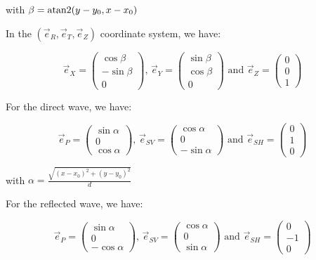 \documentclass[main.tex]{subfiles}
\begin{document}
with $\beta = \operatorname{atan2} (y - y_0 , x - x_0)$

In the $(\vec{e}_R, \vec{e}_T, \vec{e}_Z)$ coordinate system, we have:

\begin{equation}
\vec{e}_X = \begin{pmatrix}
\cos \beta \\
- \sin \beta \\
0
\end{pmatrix} \text{, } \vec{e}_Y = \begin{pmatrix}
\sin \beta \\
\cos \beta \\
0
\end{pmatrix} \text{ and } \vec{e}_Z = \begin{pmatrix}
0 \\
0 \\
1
\end{pmatrix}
\end{equation}

For the direct wave, we have:

\begin{equation}
\vec{e}_P = \begin{pmatrix}
\sin \alpha \\
0 \\
\cos \alpha
\end{pmatrix} \text{, } \vec{e}_{SV} = \begin{pmatrix}
\cos \alpha \\
0 \\
- \sin \alpha
\end{pmatrix} \text{ and } \vec{e}_{SH} = \begin{pmatrix}
0 \\
1 \\
0
\end{pmatrix}
\end{equation}

with $\alpha = \frac{\sqrt{ (x - x_0)^2 + (y - y_0)^2}}{d}$

For the reflected wave, we have:

\begin{equation}
\vec{e}_P = \begin{pmatrix}
\sin \alpha \\
0 \\
- \cos \alpha
\end{pmatrix} \text{, } \vec{e}_{SV} = \begin{pmatrix}
\cos \alpha \\
0 \\
\sin \alpha
\end{pmatrix} \text{ and } \vec{e}_{SH} = \begin{pmatrix}
0 \\
- 1 \\
0
\end{pmatrix}
\end{equation}
\end{document}

